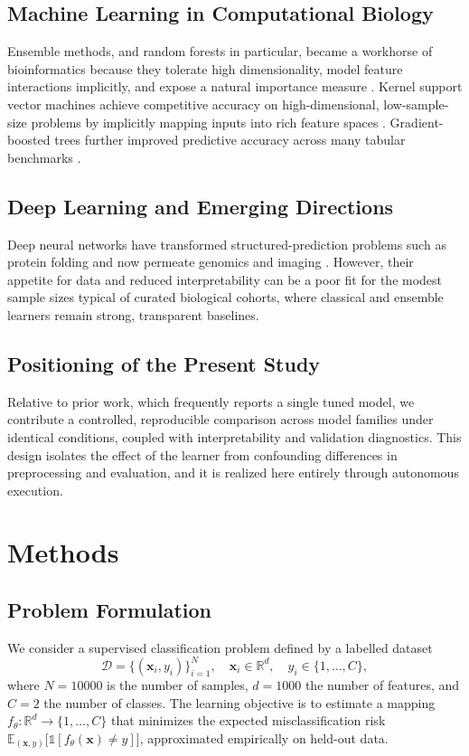 \documentclass[conference]{IEEEtran}
\begin{document}
\subsection{Machine Learning in Computational Biology}
Ensemble methods, and random forests in particular, became a workhorse of bioinformatics because
they tolerate high dimensionality, model feature interactions implicitly, and expose a natural
importance measure \cite{breiman2001random,saeys2007review}. Kernel support vector machines
achieve competitive accuracy on high-dimensional, low-sample-size problems by implicitly mapping
inputs into rich feature spaces \cite{cortes1995support,scholkopf2002learning}. Gradient-boosted
trees further improved predictive accuracy across many tabular benchmarks \cite{friedman2001greedy,chen2016xgboost}.

\subsection{Deep Learning and Emerging Directions}
Deep neural networks have transformed structured-prediction problems such as protein folding
\cite{jumper2021highly} and now permeate genomics and imaging \cite{ching2018opportunities,goodfellow2016deep}.
However, their appetite for data and reduced interpretability can be a poor fit for the modest
sample sizes typical of curated biological cohorts, where classical and ensemble learners remain
strong, transparent baselines.

\subsection{Positioning of the Present Study}
Relative to prior work, which frequently reports a single tuned model, we contribute a controlled,
reproducible comparison across model families under identical conditions, coupled with
interpretability and validation diagnostics. This design isolates the effect of the learner from
confounding differences in preprocessing and evaluation, and it is realized here entirely through
autonomous execution.

\section{Methods}
\label{sec:methods}
\subsection{Problem Formulation}
We consider a supervised classification problem defined by a labelled dataset
\begin{equation}
\mathcal{D} = \{(\mathbf{x}_i, y_i)\}_{i=1}^{N}, \quad
\mathbf{x}_i \in \mathbb{R}^{d}, \quad y_i \in \{1,\dots,C\},
\end{equation}
where $N=10000$ is the number of samples, $d=1000$ the number of features, and
$C=2$ the number of classes. The learning objective is to estimate a mapping
$f_{\theta}:\mathbb{R}^{d}\!\rightarrow\!\{1,\dots,C\}$ that minimizes the expected
misclassification risk $\mathbb{E}_{(\mathbf{x},y)}\big[\mathbb{1}[f_{\theta}(\mathbf{x})\neq y]\big]$,
approximated empirically on held-out data.
\end{document}
